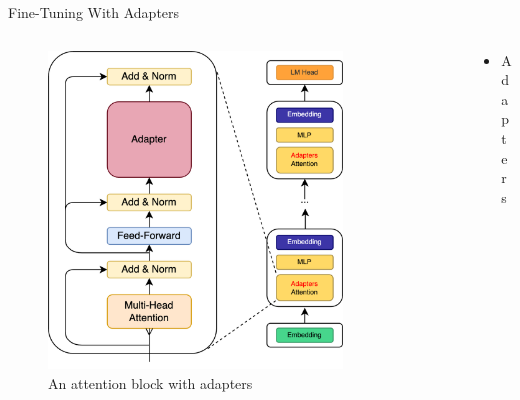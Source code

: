 \documentclass[11pt,aspectratio=169]{beamer}
\begin{document}
\begin{frame}{Fine-Tuning With Adapters~\cite{houlsby2019parameterefficienttransferlearningnlp}}
    \begin{columns}
        \begin{column}{0.5\linewidth}
            \vspace{-0.2cm}
            \begin{figure}
                \centering
                \includegraphics[width=0.8\textwidth]{llama-adapter-simple.png}
                \caption{\centering An attention block with adapters}
            \end{figure}
        \end{column}
        \begin{column}{0.5\linewidth}
            \begin{itemize}
                \item Adapters
            \end{itemize}
        \end{column}
    \end{columns}

\end{frame}
\end{document}
